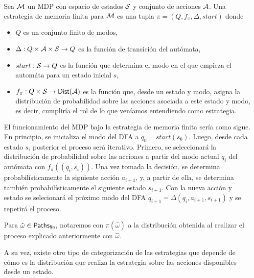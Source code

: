 \begin{definition}
	Sea $\mathcal{M}$ un MDP con espacio de estados $\mathcal{S}$ y conjunto de acciones $\mathcal{A}$. Una estrategia de memoria finita para $\mathcal{M}$ es una tupla $\pi = (Q, f_\pi, \Delta, start)$ donde
	\begin{itemize}
		\item $Q$ es un conjunto finito de modos,
		\item $\Delta : Q \times \mathcal{A} \times \mathcal{S} \rightarrow Q$ es la función de transición del autómata,
		\item $start: \mathcal{S} \rightarrow Q$ es la función que determina el modo en el que empieza el automáta para un estado inicial $s$,
		\item $f_\pi : Q \times \mathcal{S} \rightarrow \mathsf{Dist}(\mathcal{A})$ es la función que, desde un estado y modo, asigna la distribución de probabilidad sobre las acciones asociada a este estado y modo, es decir, cumpliría el rol de lo que veníamos entendiendo como estrategia.
	\end{itemize}
	El funcionamiento del MDP bajo la estrategia de memoria finita sería como sigue. En principio, se inicializa el modo del DFA a $q_0 = start(s_0)$. Luego, desde cada estado $s_i$ posterior el proceso será iterativo. Primero, se seleccionará la distribución de probabilidad sobre las acciones a partir del modo actual $q_i$ del autómata con $f_\pi((q_i,s_i))$. Una vez tomada la decisión, se determina probabilísticamente la siguiente acción $a_{i+1}$, y, a partir de ella, se determina también probabilísticamente el siguiente estado $s_{i+1}$. Con la nueva acción y estado se selecionará el próximo modo del DFA $q_{i+1} = \Delta(q_i, a_{i+1}, s_{i+1})$ y se repetirá el proceso.

	Para $\hat \omega \in \textsf{Paths}_\textsf{fin}$, notaremos con $\pi(\hat \omega)$ a la
	distribución obtenida al realizar el proceso explicado anteriormente con $\hat
		\omega$.
\end{definition}

A su vez, existe otro tipo de categorización de las estrategias que depende de
cómo es la distribución que realiza la estrategia sobre las acciones
disponibles desde un estado.


